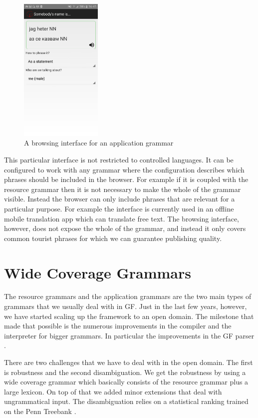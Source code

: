 \documentclass[output=paper]{LSP/langsci}
\begin{document}
\begin{figure}
\center
\includegraphics[width=0.35\textwidth]{figures/parlira}
\caption{A browsing interface for an application grammar}
\label{fig:parlira}
\end{figure}

This particular interface is not restricted to controlled languages.
It can be configured to work with any grammar where the configuration
describes which phrases should be included in the browser.
For example if it is coupled with the resource grammar then it
is not necessary to make the whole of the grammar visible.
Instead the browser can only include phrases that are relevant
for a particular purpose. For example the interface is currently used
in an offline mobile translation app \citep{angelov:android}
which can translate free text. The browsing interface, however,
does not expose the whole of the grammar, and instead it only
covers common tourist phrases for which we can guarantee publishing
quality.

\section{Wide Coverage Grammars} 

The resource grammars and the application grammars are the two main
types of grammars that we usually deal with in GF. Just in the last
few years, however, we have started scaling up the framework to 
an open domain. The milestone that made that possible is the numerous
improvements in the compiler and the interpreter for bigger grammars.
In particular the improvements in the GF parser \citep{angelov2011mechanics}.

There are two challenges that we have to deal with in the open domain.
The first is robustness and the second disambiguation. We get the robustness
by using a wide coverage grammar which basically consists of 
the resource grammar plus a large lexicon. On top of that we added
minor extensions that deal with ungrammatical input. The disambiguation
relies on a statistical ranking trained on the Penn Treebank \citep{angelov2011mechanics}.
\end{document}
